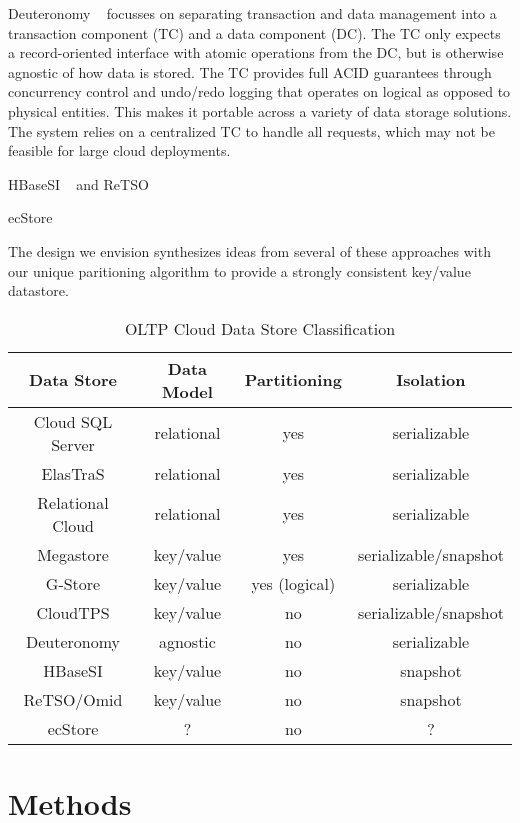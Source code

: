 \documentclass[10pt,final,journal]{IEEEtran}
\begin{document}
Deuteronomy ~\cite{Levandoski:2011:8530161} focusses on separating transaction and data management into a transaction component (TC) and a data component (DC). The TC only expects a record-oriented interface with atomic operations from the DC, but is otherwise agnostic of how data is stored. The TC provides full ACID guarantees through concurrency control and undo/redo logging that operates on logical as opposed to physical entities. This makes it portable across a variety of data storage solutions. The system relies on a centralized TC to handle all requests, which may not be feasible for large cloud deployments.

HBaseSI ~\cite{} and ReTSO ~\cite{}

ecStore ~\cite{}

The design we envision synthesizes ideas from several of these approaches with our unique paritioning algorithm to provide a strongly consistent key/value datastore.

\begin{table}[!t]
\renewcommand{\arraystretch}{1.3}
\caption{OLTP Cloud Data Store Classification}
\label{classification}
\centering
\begin{tabular}{|c|c|c|c|}
\hline
\bfseries Data Store  & \bfseries Data Model & \bfseries  Partitioning & \bfseries Isolation \\
\hline
\hline
Cloud SQL Server & relational & yes & serializable \\
ElasTraS & relational & yes & serializable \\
Relational Cloud & relational & yes & serializable \\
Megastore & key/value & yes & serializable/snapshot \\
G-Store & key/value & yes (logical) & serializable \\
CloudTPS & key/value & no & serializable/snapshot \\
Deuteronomy & agnostic & no &serializable \\
HBaseSI & key/value & no & snapshot \\
ReTSO/Omid & key/value & no & snapshot \\
ecStore & ? & no & ? \\
\hline
\end{tabular}
\end{table}





\section{Methods}
\end{document}
